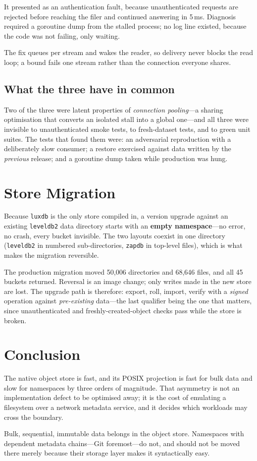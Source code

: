 \documentclass[11pt]{article}
\begin{document}
It presented as an authentication fault, because unauthenticated requests are
rejected before reaching the filer and continued answering in
5\,ms. Diagnosis required a goroutine dump from the stalled process; no
log line existed, because the code was not failing, only waiting.

The fix queues per stream and wakes the reader, so delivery never blocks the
read loop; a bound fails one stream rather than the connection everyone
shares.

\subsection{What the three have in common}

Two of the three were latent properties of \emph{connection pooling}---a
sharing optimisation that converts an isolated stall into a global one---and
all three were invisible to unauthenticated smoke tests, to fresh-dataset
tests, and to green unit suites. The tests that found them were: an
adversarial reproduction with a deliberately slow consumer; a restore
exercised against data written by the \emph{previous} release; and a
goroutine dump taken while production was hung.

\section{Store Migration}
\label{sec:migration}

Because \texttt{luxdb} is the only store compiled in, a version upgrade
against an existing \texttt{leveldb2} data directory starts with an
\textbf{empty namespace}---no error, no crash, every bucket invisible. The
two layouts coexist in one directory (\texttt{leveldb2} in numbered
sub-directories, \texttt{zapdb} in top-level files), which is what makes the
migration reversible.

The production migration moved 50{,}006 directories and 68{,}646 files, and
all 45 buckets returned. Reversal is an image change; only writes made in the
new store are lost. The upgrade path is therefore: export, roll, import,
verify with a \emph{signed} operation against \emph{pre-existing} data---the
last qualifier being the one that matters, since unauthenticated and
freshly-created-object checks pass while the store is broken.

\section{Conclusion}

The native object store is fast, and its POSIX projection is fast for bulk
data and slow for namespaces by three orders of magnitude. That asymmetry is
not an implementation defect to be optimised away; it is the cost of
emulating a filesystem over a network metadata service, and it decides which
workloads may cross the boundary.

Bulk, sequential, immutable data belongs in the object store. Namespaces with
dependent metadata chains---Git foremost---do not, and should not be moved
there merely because their storage layer makes it syntactically easy.
\end{document}

